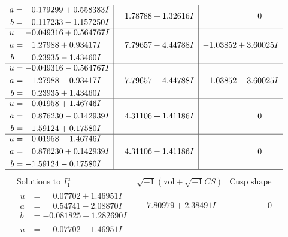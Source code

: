 \documentclass[1p]{elsarticle_modified}
\theoremstyle{definition}
\newcommand{\I}{\sqrt{-1}}
\begin{document}
$$\begin{array}{c|c|c}
\begin{aligned}
a &= -0.179299 + 0.558383 I \\
b &= \phantom{-}0.117233 - 1.157250 I\end{aligned}
 & \phantom{-}1.78788 + 1.32616 I & \phantom{-0.000000 } 0 \\ \hline\begin{aligned}
u &= -0.049316 + 0.564767 I \\
a &= \phantom{-}1.27988 + 0.93417 I \\
b &= \phantom{-}0.23935 - 1.43460 I\end{aligned}
 & \phantom{-}7.79657 - 4.44788 I & -1.03852 + 3.60025 I \\ \hline\begin{aligned}
u &= -0.049316 - 0.564767 I \\
a &= \phantom{-}1.27988 - 0.93417 I \\
b &= \phantom{-}0.23935 + 1.43460 I\end{aligned}
 & \phantom{-}7.79657 + 4.44788 I & -1.03852 - 3.60025 I \\ \hline\begin{aligned}
u &= -0.01958 + 1.46746 I \\
a &= \phantom{-}0.876230 - 0.142939 I \\
b &= -1.59124 + 0.17580 I\end{aligned}
 & \phantom{-}4.31106 + 1.41186 I & \phantom{-0.000000 } 0 \\ \hline\begin{aligned}
u &= -0.01958 - 1.46746 I \\
a &= \phantom{-}0.876230 + 0.142939 I \\
b &= -1.59124 - 0.17580 I\end{aligned}
 & \phantom{-}4.31106 - 1.41186 I & \phantom{-0.000000 } 0\\
 \hline 
 \end{array}$$\newpage$$\begin{array}{c|c|c}  
\text{Solutions to }I^u_{1}& \I (\text{vol} + \sqrt{-1}CS) & \text{Cusp shape}\\
 \hline 
\begin{aligned}
u &= \phantom{-}0.07702 + 1.46951 I \\
a &= \phantom{-}0.54741 - 2.08870 I \\
b &= -0.081825 + 1.282690 I\end{aligned}
 & \phantom{-}7.80979 + 2.38491 I & \phantom{-0.000000 } 0 \\ \hline\begin{aligned}
u &= \phantom{-}0.07702 - 1.46951 I \\

\end{aligned}
\end{array}$$
\end{document}
